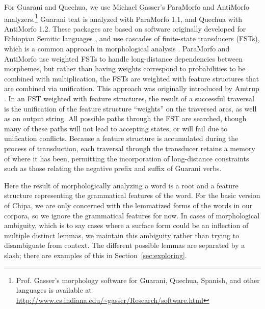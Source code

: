 For Guarani and Quechua, we use Michael Gasser's ParaMorfo and AntiMorfo
analyzers.\footnote{Prof. Gasser's morphology software for Guarani, Quechua,
Spanish, and other languages is available at
\url{http://www.cs.indiana.edu/~gasser/Research/software.html}} Guarani text is
analyzed with ParaMorfo 1.1, and Quechua with AntiMorfo 1.2.  These packages
are based on software originally developed for Ethiopian Semitic languages
\cite{gasser:eacl09}, and use cascades of finite-state transducers (FSTs),
which is a common approach in morphological analysis \cite{beesley+karttunen}.
ParaMorfo and AntiMorfo use weighted FSTs to handle long-distance dependencies
between morphemes, but rather than having weights correspond to probabilities
to be combined with multiplication, the FSTs are weighted with feature
structures that are combined via unification. This approach was originally
introduced by Amtrup \cite{amtrup:03}. In an FST weighted with feature
structures, the result of a successful traversal is the unification of the
feature structure ``weights'' on the traversed arcs, as well as an output
string. All possible paths through the FST are searched, though many of these
paths will not lead to accepting states, or will fail due to unification
conflicts.  Because a feature structure is accumulated during the process of
transduction, each traversal through the transducer retains a memory of where
it has been, permitting the incorporation of long-distance constraints such as
those relating the negative prefix and suffix of Guarani verbs.

Here the result of morphologically analyzing a word is a root and a feature
structure representing the grammatical features of the word.  For the basic
version of Chipa, we are only concerned with the lemmatized forms of the words
in our corpora, so we ignore the grammatical features for now.  In cases of
morphological ambiguity, which is to say cases where a surface form could be an
inflection of multiple distinct lemmas, we maintain this ambiguity rather than
trying to disambiguate from context.  The different possible lemmas are
separated by a slash; there are examples of this in
Section~\ref{sec:exploring}.



